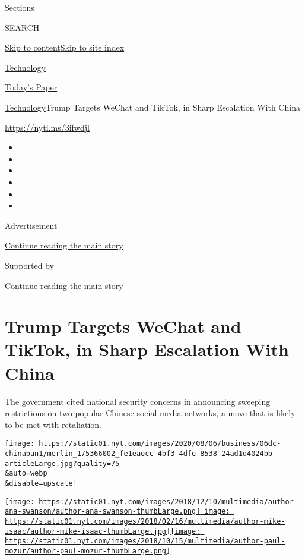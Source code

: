Sections

SEARCH

\protect\hyperlink{site-content}{Skip to
content}\protect\hyperlink{site-index}{Skip to site index}

\href{https://www.nytimes.com/section/technology}{Technology}

\href{https://myaccount.nytimes.com/auth/login?response_type=cookie\&client_id=vi}{}

\href{https://www.nytimes.com/section/todayspaper}{Today's Paper}

\href{/section/technology}{Technology}\textbar{}Trump Targets WeChat and
TikTok, in Sharp Escalation With China

\href{https://nyti.ms/3ifwdjl}{https://nyti.ms/3ifwdjl}

\begin{itemize}
\item
\item
\item
\item
\item
\item
\end{itemize}

Advertisement

\protect\hyperlink{after-top}{Continue reading the main story}

Supported by

\protect\hyperlink{after-sponsor}{Continue reading the main story}

\hypertarget{trump-targets-wechat-and-tiktok-in-sharp-escalation-with-china}{%
\section{Trump Targets WeChat and TikTok, in Sharp Escalation With
China}\label{trump-targets-wechat-and-tiktok-in-sharp-escalation-with-china}}

The government cited national security concerns in announcing sweeping
restrictions on two popular Chinese social media networks, a move that
is likely to be met with retaliation.

\texttt{[image: https://static01.nyt.com/images/2020/08/06/business/06dc-chinaban1/merlin\_175366002\_fe1eaecc-4bf3-4dfe-8538-24ad1d4024bb-articleLarge.jpg?quality=75\\\&auto=webp\\\&disable=upscale]}

\href{https://www.nytimes.com/by/ana-swanson}{\texttt{[image: https://static01.nyt.com/images/2018/12/10/multimedia/author-ana-swanson/author-ana-swanson-thumbLarge.png]}}\href{https://www.nytimes.com/by/mike-isaac}{\texttt{[image: https://static01.nyt.com/images/2018/02/16/multimedia/author-mike-isaac/author-mike-isaac-thumbLarge.jpg]}}\href{https://www.nytimes.com/by/paul-mozur}{\texttt{[image: https://static01.nyt.com/images/2018/10/15/multimedia/author-paul-mozur/author-paul-mozur-thumbLarge.png]}}

